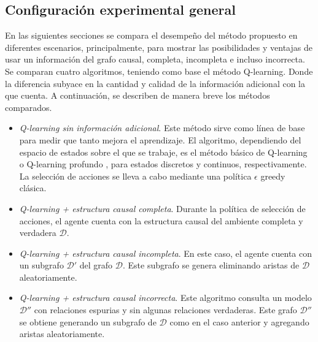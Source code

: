 \subsection{Configuración experimental general}

En las siguientes secciones se compara el desempeño 
del método propuesto en diferentes escenarios, principalmente, para mostrar 
las posibilidades y ventajas de usar un información del grafo causal, completa, incompleta e incluso incorrecta. 
Se comparan cuatro algoritmos, teniendo como base
el método Q-learning. Donde la diferencia subyace en la cantidad y calidad de la información adicional con la que cuenta. A continuación, se describen de manera breve los métodos
comparados.

\begin{itemize}
    \item \textit{Q-learning sin información adicional}. Este método sirve como
    línea de base para medir que tanto mejora el aprendizaje. El algoritmo, dependiendo del espacio de estados sobre el que se trabaje, es el 
    método básico de Q-learning \cite{watkins1992q} o Q-learning profundo \cite{mnih2013playing}, para estados
    discretos y continuos, respectivamente. La selección de acciones se lleva a cabo mediante una política $\epsilon$ greedy clásica.
    \item \textit{Q-learning + estructura causal completa}. Durante la política de selección de acciones, el agente cuenta con la estructura causal del ambiente completa y verdadera $\mathcal{D}$.
    \item \textit{Q-learning + estructura causal incompleta}. En este caso, el agente cuenta con un subgrafo $\mathcal{D'}$ del grafo $\mathcal{D}$. Este subgrafo se genera eliminando aristas de $\mathcal{D}$ aleatoriamente.
    \item \textit{Q-learning + estructura causal incorrecta}. Este algoritmo consulta un modelo $\mathcal{D}''$ con relaciones espurias y sin algunas relaciones verdaderas. Este grafo $\mathcal{D}''$ se obtiene generando un subgrafo de $\mathcal{D}$ como en el caso anterior y agregando aristas aleatoriamente.
\end{itemize}

